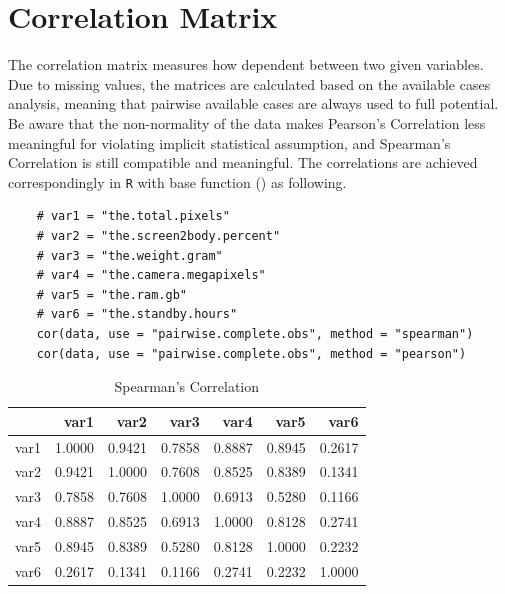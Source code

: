 \documentclass[utf8,english]{gradu3}
\begin{document}
\section{Correlation Matrix}
\label{app:corr}

The correlation matrix measures how dependent between two given variables. Due to missing values, the matrices are calculated based on the available cases analysis, meaning that pairwise available cases are always used to full potential. Be aware that the non-normality of the data makes Pearson's Correlation less meaningful for violating implicit statistical assumption, and Spearman's Correlation is still compatible and meaningful. The correlations are achieved correspondingly in \texttt{R} with base function (\cite{RBase}) as following.

\begin{verbatim}
    # var1 = "the.total.pixels"
    # var2 = "the.screen2body.percent"
    # var3 = "the.weight.gram"
    # var4 = "the.camera.megapixels"
    # var5 = "the.ram.gb"
    # var6 = "the.standby.hours"
    cor(data, use = "pairwise.complete.obs", method = "spearman")
    cor(data, use = "pairwise.complete.obs", method = "pearson")
\end{verbatim}

\begin{table}[ht]
\caption{Spearman's Correlation}
\centering
\begin{tabular}{rrrrrrr}
  \hline
 & var1 & var2 & var3 & var4 & var5 & var6 \\ 
  \hline
var1 & 1.0000 & 0.9421 & 0.7858 & 0.8887 & 0.8945 & 0.2617 \\ 
  var2 & 0.9421 & 1.0000 & 0.7608 & 0.8525 & 0.8389 & 0.1341 \\ 
  var3 & 0.7858 & 0.7608 & 1.0000 & 0.6913 & 0.5280 & 0.1166 \\ 
  var4 & 0.8887 & 0.8525 & 0.6913 & 1.0000 & 0.8128 & 0.2741 \\ 
  var5 & 0.8945 & 0.8389 & 0.5280 & 0.8128 & 1.0000 & 0.2232 \\ 
  var6 & 0.2617 & 0.1341 & 0.1166 & 0.2741 & 0.2232 & 1.0000 \\ 
   \hline
\end{tabular}
\end{table}
\end{document}
